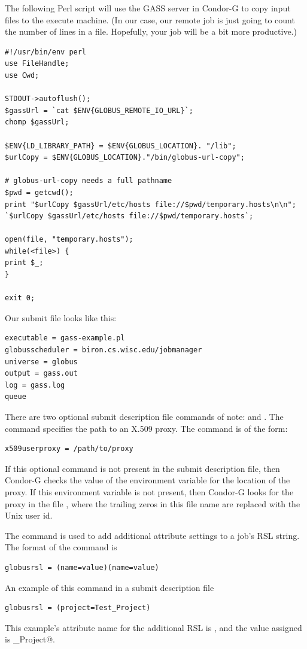 The following Perl script will use the GASS server in Condor-G
to copy input files to the execute machine.
(In our case, our remote job
is just going to count the number of lines in a file.
Hopefully, your job will be a bit more productive.)

\footnotesize
\begin{verbatim}
#!/usr/bin/env perl
use FileHandle;
use Cwd;

STDOUT->autoflush();
$gassUrl = `cat $ENV{GLOBUS_REMOTE_IO_URL}`;
chomp $gassUrl;

$ENV{LD_LIBRARY_PATH} = $ENV{GLOBUS_LOCATION}. "/lib";
$urlCopy = $ENV{GLOBUS_LOCATION}."/bin/globus-url-copy";

# globus-url-copy needs a full pathname
$pwd = getcwd();
print "$urlCopy $gassUrl/etc/hosts file://$pwd/temporary.hosts\n\n";
`$urlCopy $gassUrl/etc/hosts file://$pwd/temporary.hosts`;

open(file, "temporary.hosts");
while(<file>) {
print $_;
}

exit 0;
\end{verbatim}
\normalsize

Our submit file looks like this:

\footnotesize
\begin{verbatim}
executable = gass-example.pl
globusscheduler = biron.cs.wisc.edu/jobmanager
universe = globus
output = gass.out
log = gass.log
queue
\end{verbatim}
\normalsize

There are two optional submit description file commands
of note:
 and
.
The  command specifies the path to
an X.509 proxy.
The command is of the form:
\begin{verbatim}
x509userproxy = /path/to/proxy
\end{verbatim}
If this optional command is not present in the submit description file,
then Condor-G checks the value of the environment variable
 for the location of the proxy.
If this environment variable is not present, then Condor-G
looks for the proxy in the file
,
where the trailing zeros in this file name are
replaced with the Unix user id.

The  command is used to add additional
attribute settings to a job's RSL string.
The format of the  command is
\begin{verbatim}
globusrsl = (name=value)(name=value)
\end{verbatim}
An example of this command in a submit description file
\begin{verbatim}
globusrsl = (project=Test_Project)
\end{verbatim}
This example's attribute name for the additional RSL is
\verb@project@, and the value assigned is \verb@Test_Project@.

